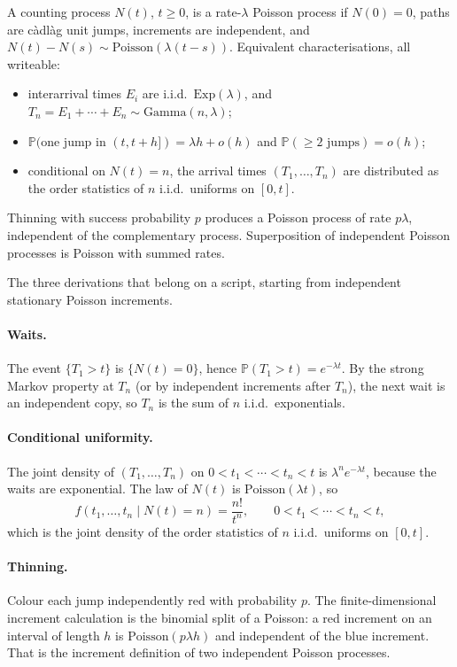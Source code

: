 \begin{definition}
\label{def:pp}
A counting process \(N(t)\), \(t\ge 0\), is a rate-\(\lambda\) Poisson process if \(N(0)=0\), paths are c\`adl\`ag unit jumps, increments are independent, and \(N(t)-N(s)\sim\mathrm{Poisson}(\lambda(t-s))\). Equivalent characterisations, all writeable:
\begin{itemize}
    \item interarrival times \(E_{i}\) are i.i.d.\ \(\mathrm{Exp}(\lambda)\), and \(T_{n}=E_{1}+\cdots+E_{n}\sim\mathrm{Gamma}(n,\lambda)\);
    \item \(\mathbb{P}(\text{one jump in }(t,t+h])=\lambda h+o(h)\) and \(\mathbb{P}(\ge 2\text{ jumps})=o(h)\);
    \item conditional on \(N(t)=n\), the arrival times \((T_{1},\ldots,T_{n})\) are distributed as the order statistics of \(n\) i.i.d.\ uniforms on \([0,t]\).
\end{itemize}
Thinning with success probability \(p\) produces a Poisson process of rate \(p\lambda\), independent of the complementary process. Superposition of independent Poisson processes is Poisson with summed rates.
\end{definition}

The three derivations that belong on a script, starting from independent stationary Poisson increments.

\paragraph{Waits.}
The event \(\{T_{1}>t\}\) is \(\{N(t)=0\}\), hence \(\mathbb{P}(T_{1}>t)=e^{-\lambda t}\). By the strong Markov property at \(T_{n}\) (or by independent increments after \(T_{n}\)), the next wait is an independent copy, so \(T_{n}\) is the sum of \(n\) i.i.d.\ exponentials.

\paragraph{Conditional uniformity.}
The joint density of \((T_{1},\ldots,T_{n})\) on \(0<t_{1}<\cdots<t_{n}<t\) is \(\lambda^{n}e^{-\lambda t}\), because the waits are exponential. The law of \(N(t)\) is \(\mathrm{Poisson}(\lambda t)\), so
\[
f(t_{1},\ldots,t_{n}\mid N(t)=n)
=
\frac{n!}{t^{n}},
\qquad
0<t_{1}<\cdots<t_{n}<t,
\]
which is the joint density of the order statistics of \(n\) i.i.d.\ uniforms on \([0,t]\).

\paragraph{Thinning.}
Colour each jump independently red with probability \(p\). The finite-dimensional increment calculation is the binomial split of a Poisson: a red increment on an interval of length \(h\) is \(\mathrm{Poisson}(p\lambda h)\) and independent of the blue increment. That is the increment definition of two independent Poisson processes.

